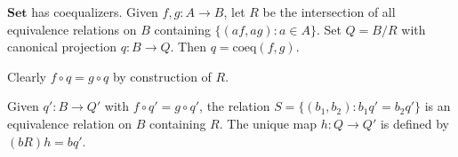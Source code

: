 $\mathbf{Set}$ has coequalizers. Given $f, g: A \to B$, let $R$ be the intersection of all equivalence relations on $B$ containing $\{(af, ag) : a \in A\}$. Set $Q = B/R$ with canonical projection $q: B \to Q$. Then $q = \text{coeq}(f, g)$.

Clearly $f \circ q = g \circ q$ by construction of $R$.

Given $q': B \to Q'$ with $f \circ q' = g \circ q'$, the relation $S = \{(b_1, b_2) : b_1 q' = b_2 q'\}$ is an equivalence relation on $B$ containing $R$. The unique map $h: Q \to Q'$ is defined by $(bR)h = bq'$.
